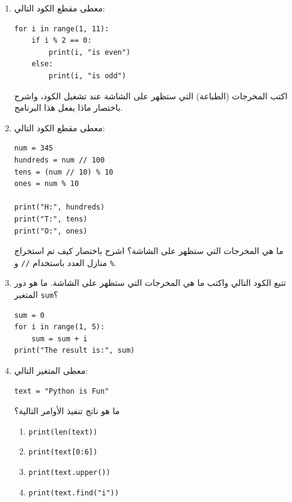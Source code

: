 \documentclass[14pt]{extarticle}
\begin{document}
\begin{enumerate}[itemsep=2em]
    \item
    معطى مقطع الكود التالي:
    \begin{boxCode}
    \begin{english}
    \begin{verbatim}
for i in range(1, 11):
    if i % 2 == 0:
        print(i, "is even")
    else:
        print(i, "is odd")
    \end{verbatim}
    \end{english}
    \end{boxCode}
    اكتب المخرجات (الطباعة) التي ستظهر على الشاشة عند تشغيل الكود، واشرح باختصار ماذا يفعل هذا البرنامج.

    \clearpage
    \item
    معطى مقطع الكود التالي:
    \begin{boxCode}
    \begin{english}
    \begin{verbatim}
num = 345
hundreds = num // 100
tens = (num // 10) % 10
ones = num % 10

print("H:", hundreds)
print("T:", tens)
print("O:", ones)
    \end{verbatim}
    \end{english}
    \end{boxCode}
    ما هي المخرجات التي ستظهر على الشاشة؟ اشرح باختصار كيف تم استخراج منازل العدد باستخدام \texttt{//} و \texttt{\%}.

    \item
    تتبع الكود التالي واكتب ما هي المخرجات التي ستظهر على الشاشة. ما هو دور المتغير \texttt{sum}؟
    \begin{boxCode}
    \begin{english}
    \begin{verbatim}
sum = 0
for i in range(1, 5):
    sum = sum + i
print("The result is:", sum)
    \end{verbatim}
    \end{english}
    \end{boxCode}

    \item
    معطى المتغير التالي:
    \begin{boxCode}
    \begin{english}
    \begin{verbatim}
text = "Python is Fun"
    \end{verbatim}
    \end{english}
    \end{boxCode}
    ما هو ناتج تنفيذ الأوامر التالية؟
    \begin{enumerate}[label=(\alph*)]
        \item \texttt{print(len(text))}
        \item \texttt{print(text[0:6])}
        \item \texttt{print(text.upper())}
        \item \texttt{print(text.find("i"))}
    \end{enumerate}


\end{enumerate}
\end{document}
